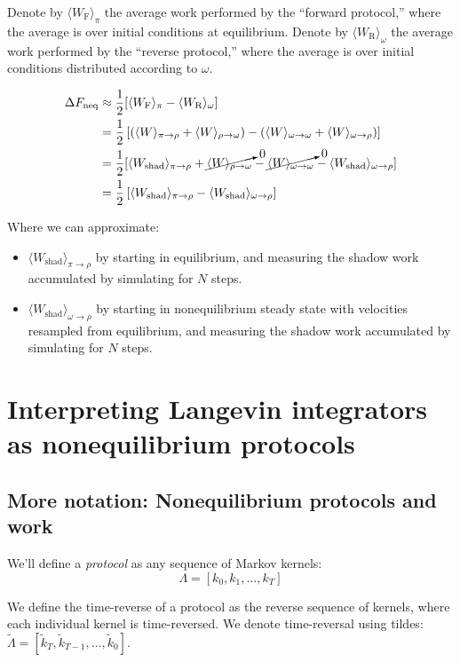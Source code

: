 \documentclass[11pt]{article}
\begin{document}
Denote by $\langle W_\text{F} \rangle_\pi$ the average work performed by the ``forward protocol,'' where the average is over initial conditions at equilibrium. Denote by $\langle W_\text{R} \rangle_\omega$ the average work performed by the ``reverse protocol,'' where the average is over initial conditions distributed according to $\omega$.

$$\begin{aligned}
\Delta F_\text{neq}
& \approx
\frac{1}{2} [ \langle W_\text{F} \rangle_\pi - \langle W_\text{R} \rangle_\omega ]\\
&= \frac{1}{2}
\left[
\left(
\langle W \rangle_{\pi \to \rho}
+ \langle W \rangle_{\rho \to \omega}
\right)
- \left(
\langle W \rangle_{\omega \to \omega} + 
\langle W \rangle_{\omega \to \rho}
\right)
\right]\\
&= \frac{1}{2} [
\langle W_\text{shad} \rangle_{\pi \to \rho}
+ \cancelto{0}{\langle W \rangle_{\rho \to \omega}}
- 
\cancelto{0}{\langle W \rangle_{\omega \to \omega}} 
- 
\langle W_\text{shad} \rangle_{\omega \to \rho} ]\\
&= \frac{1}{2} \left[
\langle W_\text{shad} \rangle_{\pi \to \rho}
- \langle W_\text{shad} \rangle_{\omega \to \rho} \right]\\
\end{aligned}$$

Where we can approximate:
\begin{itemize}
\item $\langle W_\text{shad} \rangle_{\pi \to \rho}$ by starting in equilibrium, and measuring the shadow work accumulated by simulating for $N$ steps.
\item $\langle W_\text{shad} \rangle_{\omega \to \rho}$ by starting in nonequilibrium steady state with velocities resampled from equilibrium, and measuring the shadow work accumulated by simulating for $N$ steps.
\end{itemize}

\section{Interpreting Langevin integrators as nonequilibrium protocols}
\subsection{More notation: Nonequilibrium protocols and work}
We'll define a \emph{protocol} as any sequence of Markov kernels: $$\Lambda=[k_0, k_1, \dots, k_T]$$

We define the time-reverse of a protocol as the reverse sequence of kernels, where each individual kernel is time-reversed.
We denote time-reversal using tildes: $\tilde{\Lambda} = [\tilde{k}_T, \tilde{k}_{T-1}, \dots, \tilde{k}_0]$.
\end{document}
